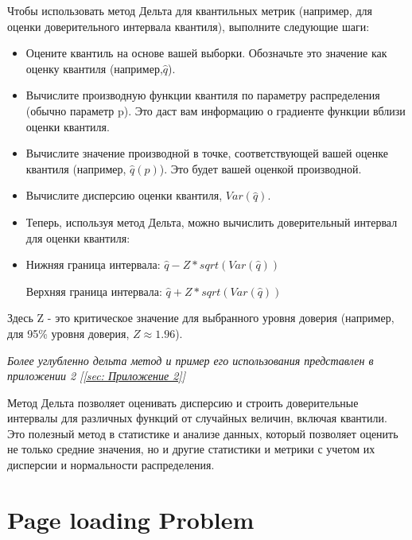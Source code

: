 \documentclass[specialist,
               substylefile = spbu_report.rtx,
               subf,href,colorlinks=true, 12pt]{disser}
\begin{document}
Чтобы использовать метод Дельта для квантильных метрик (например, для оценки доверительного интервала квантиля), выполните следующие шаги:

\begin{itemize}
\item Оцените квантиль на основе вашей выборки. Обозначьте это значение как оценку квантиля (например,$ \widehat{q}$).
\item Вычислите производную функции квантиля по параметру распределения (обычно параметр p). Это даст вам информацию о градиенте функции вблизи оценки квантиля.
\item Вычислите значение производной в точке, соответствующей вашей оценке квантиля (например, $\widehat{q}(p)$). Это будет вашей оценкой производной.
\item Вычислите дисперсию оценки квантиля, $Var(\widehat{q})$.
\item Теперь, используя метод Дельта, можно вычислить доверительный интервал для оценки квантиля:
\item 
    Нижняя граница интервала: $\widehat{q} - Z * sqrt(Var(\widehat{q}))$

    Верхняя граница интервала: $\widehat{q} + Z * sqrt(Var(\widehat{q}))$
\end{itemize}
Здесь Z - это критическое значение для выбранного уровня доверия (например, для 95\% уровня доверия, $Z  \approx 1.96$).

 \textit{Более углубленно дельта метод и пример его использования представлен в приложении 2 [\ref{sec: Приложение 2}]}

Метод Дельта позволяет оценивать дисперсию и строить доверительные интервалы для различных функций от случайных величин, включая квантили. Это полезный метод в статистике и анализе данных, который позволяет оценить не только средние значения, но и другие статистики и метрики с учетом их дисперсии и нормальности распределения.



\newpage
\section{Page loading Problem}
\end{document}
